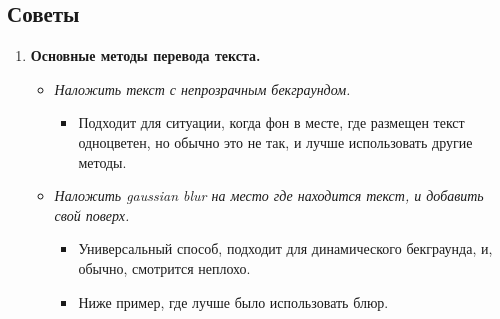 \documentclass[
a4paper, %
12pt, %
article,
onecolumn, %
openany, %
]{memoir}
\begin{document}
\subsection{Советы}
\begin{enumerate}
\item \textbf{Основные методы перевода текста.}

    \begin{itemize}
        \item \emph{Наложить текст с непрозрачным бекграундом.} 

            \begin{itemize}
                \item Подходит для ситуации, когда фон в месте, где размещен текст
            одноцветен, но обычно это не так, и лучше использовать другие методы.
            \end{itemize}

        \item \emph{Наложить gaussian blur на место где находится текст, и добавить
            свой поверх.}

            \begin{itemize}
                \item Универсальный способ, подходит для 
            динамического бекграунда, и, обычно, смотрится неплохо.

                \item Ниже пример, где лучше было использовать блюр.


\end{itemize}
\end{itemize}
\end{enumerate}
\end{document}

